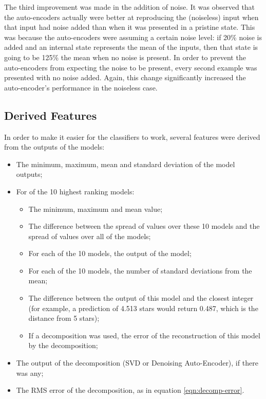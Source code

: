 \documentclass{article}
\begin{document}
The third improvement was made in the addition of noise.  It was observed that the auto-encoders actually were better at reproducing the (noiseless) input when that input had noise added than when it was presented in a pristine state.  This was because the auto-encoders were assuming a certain noise level: if 20\% noise is added and an internal state represents the mean of the inputs, then that state is going to be 125\% the mean when no noise is present.  In order to prevent the auto-encoders from expecting the noise to be present, every second example was presented with no noise added.  Again, this change significantly increased the auto-encoder's performance in the noiseless case.

\subsection{Derived Features}

In order to make it easier for the classifiers to work, several features were derived from the outputs of the models:

\begin{itemize}
\item The minimum, maximum, mean and standard deviation of the model outputs;
\item For of the 10 highest ranking models:
  \begin{itemize}
    \item The minimum, maximum and mean value;
    \item The difference between the spread of values over these 10 models and the spread of values over all of the models;
    \item For each of the 10 models, the output of the model;
    \item For each of the 10 models, the number of standard deviations from the mean;
    \item The difference between the output of this model and the closest integer (for example, a prediction of 4.513 stars would return 0.487, which is the distance from 5 stars);
    \item If a decomposition was used, the error of the reconstruction of this model by the decomposition;
  \end{itemize}
\item The output of the decomposition (SVD or Denoising Auto-Encoder), if there was any;
\item The RMS error of the decomposition, as in equation \ref{eqn:decomp-error}.

\end{itemize}
\end{document}
